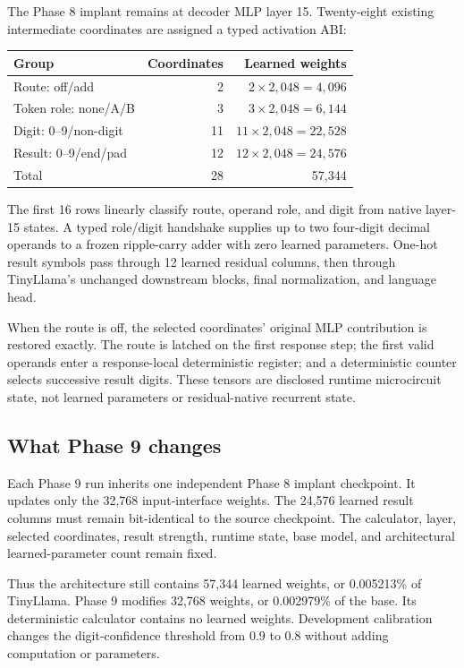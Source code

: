\documentclass[11pt]{article}
\begin{document}
The Phase 8 implant remains at decoder MLP layer 15. Twenty-eight existing
intermediate coordinates are assigned a typed activation ABI:

\begin{center}
\small
\begin{tabular}{lrr}
\toprule
Group & Coordinates & Learned weights\\
\midrule
Route: off/add & 2 & $2\times2{,}048=4{,}096$\\
Token role: none/A/B & 3 & $3\times2{,}048=6{,}144$\\
Digit: 0--9/non-digit & 11 & $11\times2{,}048=22{,}528$\\
Result: 0--9/end/pad & 12 & $12\times2{,}048=24{,}576$\\
\midrule
Total & 28 & 57,344\\
\bottomrule
\end{tabular}
\end{center}

The first 16 rows linearly classify route, operand role, and digit from native
layer-15 states. A typed role/digit handshake supplies up to two four-digit
decimal operands to a frozen ripple-carry adder with zero learned parameters.
One-hot result symbols pass through 12 learned residual columns, then through
TinyLlama's unchanged downstream blocks, final normalization, and language
head.

When the route is off, the selected coordinates' original MLP contribution is
restored exactly. The route is latched on the first response step; the first
valid operands enter a response-local deterministic register; and a
deterministic counter selects successive result digits. These tensors are
disclosed runtime microcircuit state, not learned parameters or
residual-native recurrent state.

\subsection{What Phase 9 changes}

Each Phase 9 run inherits one independent Phase 8 implant checkpoint. It
updates only the 32,768 input-interface weights. The 24,576 learned result
columns must remain bit-identical to the source checkpoint. The calculator,
layer, selected coordinates, result strength, runtime state, base model, and
architectural learned-parameter count remain fixed.

Thus the architecture still contains 57,344 learned weights, or
0.005213\% of TinyLlama. Phase 9 modifies 32,768 weights, or 0.002979\% of the
base. Its deterministic calculator contains no learned weights. Development
calibration changes the digit-confidence threshold from 0.9 to 0.8 without
adding computation or parameters.
\end{document}
